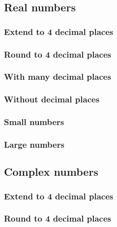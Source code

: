 \subsection{Real numbers}

\subsubsection{Extend to 4 decimal places}

\subsubsection{Round to 4 decimal places}

\subsubsection{With many decimal places}

\subsubsection{Without decimal places}

\subsubsection{Small numbers}

\subsubsection{Large numbers}

\subsection{Complex numbers}

\subsubsection{Extend to 4 decimal places}

\subsubsection{Round to 4 decimal places}


